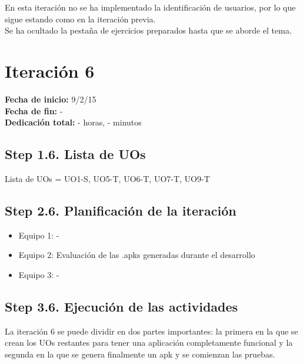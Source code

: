 \vspace{0.1cm}

En esta iteración no se ha implementado la identificación de usuarios, por lo que sigue estando como en la iteración previa.\\

Se ha ocultado la pestaña de ejercicios preparados hasta que se aborde el tema.\\


\section{Iteración 6}
\label{it6}

\begin{flushleft}
\textbf{Fecha de inicio:} 9/2/15\\
\textbf{Fecha de fin:} -\\
\textbf{Dedicación total:} - horas, - minutos\\
\end{flushleft}

\subsection{Step 1.6. Lista de UOs}
\label{it6:1.6}

Lista de UOs = {UO1-S, UO5-T, UO6-T, UO7-T, UO9-T}

\subsection{Step 2.6. Planificación de la iteración}
\label{it6:2.6}

\begin{itemize}
\item Equipo 1: -
\item Equipo 2: Evaluación de las .apks generadas durante el desarrollo
\item Equipo 3: -
\end{itemize}

\subsection{Step 3.6. Ejecución de las actividades}
\label{it6:3.6}

La iteración 6 se puede dividir en dos partes importantes: la primera en la que se crean los UOs restantes para tener una aplicación completamente funcional y la segunda en la que se genera finalmente un apk y se comienzan las pruebas.\\

